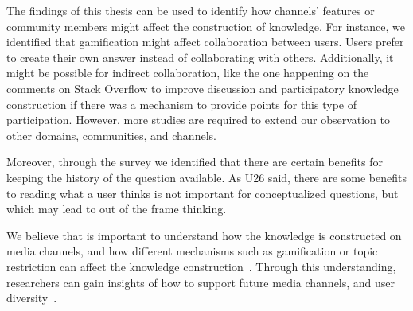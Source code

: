 \documentclass{sig-alternate-05-2015}
\begin{document}
	The findings of this thesis can be used to identify how channels' features or community members might affect the construction of knowledge.
	For instance, we identified that gamification might affect collaboration between users. 
	Users prefer to create their own answer instead of collaborating with others.
	Additionally, it might be possible for indirect collaboration, like the one happening on the comments on Stack Overflow to improve discussion and participatory knowledge construction if there was a mechanism to provide points for this type of participation.
	However, more studies are required to extend our observation to other domains, communities, and channels.

	Moreover, through the survey we identified that there are certain benefits for keeping the history of the question available.
	As U26 said, there are some benefits to reading what a user thinks is not important for conceptualized questions, but which may lead to out of the frame thinking. 

	We believe that is important to understand how the knowledge is constructed on media channels, and how different mechanisms such as gamification or topic restriction can affect the knowledge construction~\cite{Li2015}.
	Through this understanding, researchers can gain insights of how to support future media channels, and user diversity~\cite{Vasilescu2014b}. 	


\end{document}
